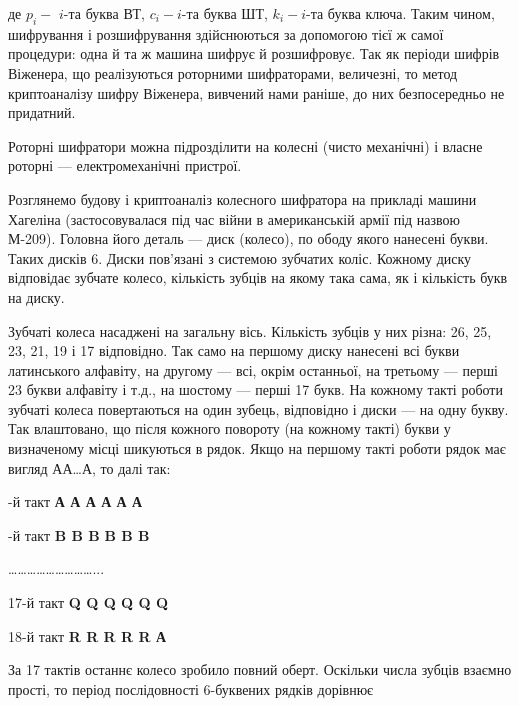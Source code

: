 \bigskip

де  $p_{i}-$  $i${}-та буква ВТ,   $c_i-i${}-та буква ШТ, 
$k_i-i${}-та буква ключа. Таким чином, шифрування і розшифрування
здійснюються за допомогою тієї ж самої процедури: одна й та ж машина шифрує й
розшифровує. Так як періоди шифрів Віженера, що реалізуються роторними
шифраторами, величезні, то метод криптоаналізу шифру Віженера, вивчений нами
раніше, до них безпосередньо не придатний.

Роторні шифратори можна підрозділити на колесні (чисто механічні) і власне
роторні --- електромеханічні пристрої.

Розглянемо будову і криптоаналіз колесного шифратора на прикладі машини Хагеліна
(застосовувалася під час війни в американській армії під назвою М-209). Головна
його деталь --- диск (колесо), по ободу якого нанесені букви. Таких дисків 6.
Диски пов’язані з системою зубчатих коліс. Кожному диску відповідає зубчате
колесо, кількість зубців на якому така сама, як і кількість букв на диску. 

Зубчаті колеса насаджені на загальну вісь. Кількість зубців у них різна: 26, 25,
23, 21, 19 і 17 відповідно. Так само на першому диску нанесені всі букви
латинського алфавіту, на другому --- всі, окрім останньої, на третьому --- перші 23
букви алфавіту і т.д., на шостому --- перші 17 букв. На кожному такті роботи
зубчаті колеса повертаються на один зубець, відповідно і диски --- на одну букву.
Так влаштовано, що після кожного повороту  (на кожному такті)  букви у
визначеному  місці  шикуються  в рядок. Якщо на першому  такті роботи рядок має
вигляд АА…А, то далі так:

\begin{figure}
\centering
\begin{minipage}{0.0161in}

\bigskip
\end{minipage}
\end{figure}
{-й такт  \textbf{А А А А А А}
\par}

{-й такт  \textbf{B B B}\textbf{ }\textbf{B B B}
\par}

{\centering
………………………...
\par}

 17-й такт  \textbf{Q Q Q Q Q Q}

 18-й такт  \textbf{R R R R R А}


\bigskip

За 17 тактів останнє колесо зробило повний оберт. Оскільки числа зубців взаємно
прості, то період послідовності 6-буквених рядків дорівнює 


